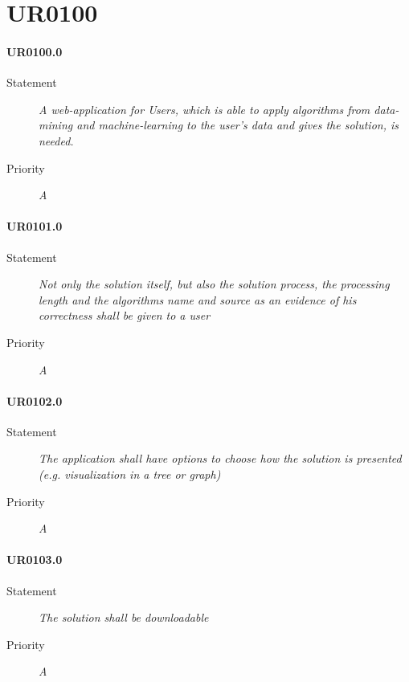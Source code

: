 
\section{UR0100}

\paragraph{UR0100.0}
\begin{description}
\item [Statement] \textit{ 
A web-application for \glspl{User}, which is able to apply algorithms from data-mining and machine-learning to the user's data and gives the solution, is needed.
}
\item [Priority] \textit{A}
\end{description}

\paragraph{UR0101.0}
\begin{description}
\item [Statement] \textit{
Not only the solution itself, but also the solution process, the processing length and the algorithms name and source as an evidence of his correctness shall be given to a user
}
\item [Priority] \textit{A}
\end{description}

\paragraph{UR0102.0}
\begin{description}
\item [Statement] \textit{
The application shall have options to choose how the solution is presented (e.g. visualization in a tree or graph)
}
\item [Priority] \textit{A}
\end{description}

\paragraph{UR0103.0}
\begin{description}
\item [Statement] \textit{
The solution shall be downloadable
}
\item [Priority] \textit{A}
\end{description}

